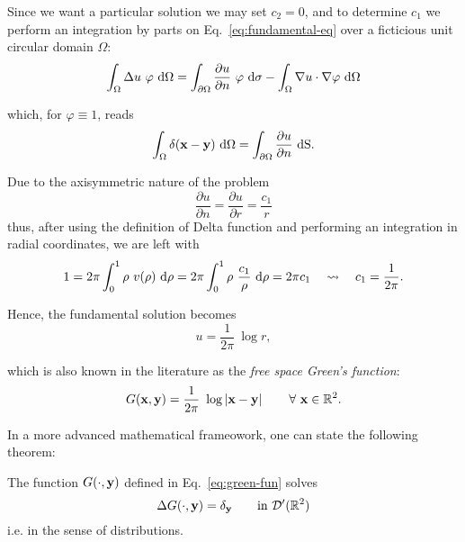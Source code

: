 Since we want a particular solution we may set $c_2=0$, and to determine $c_1$ we perform an integration by parts on Eq.~\eqref{eq:fundamental-eq} over a ficticious unit circular domain $\Omega$:
\begin{equation*}
\int_\Omega \Delta u\ \varphi \  \mathrm{d} \Omega = \int_{\partial\Omega}\frac{\partial u}{\partial n}\ \varphi \  \mathrm{d} \sigma-\int_\Omega \nabla u \cdot \nabla \varphi \  \mathrm{d} \Omega 
\end{equation*}

which, for $\varphi\equiv 1$, reads
\begin{equation*}
\int_\Omega \delta(\mathbf{x}-\mathbf{y})\  \mathrm{d} \Omega = \int_{\partial\Omega}\frac{\partial u}{\partial n} \  \mathrm{d} \mathrm{S}.
\end{equation*}

Due to the axisymmetric nature of the problem
\begin{equation*}
\frac{\partial u}{\partial n}=\frac{\partial u}{\partial r} = \frac{c_1}{r}
\end{equation*}
thus, after using the definition of Delta function and performing an integration in radial coordinates, we are left with
\begin{equation*}
1=2\pi \int_0^1 \rho\ v(\rho) \  \mathrm{d} \rho = 2\pi \int_0^1 \rho\ \frac{c_1}{\rho}\  \mathrm{d} \rho =2\pi c_1\quad\leadsto \quad c_1=\frac{1}{2\pi}.
\end{equation*}

Hence, the fundamental solution becomes 
\begin{equation*}
u=\frac{1}{2\pi}\ \log r,
\end{equation*}

which is also known in the literature as the \emph{free space Green's function}:
\begin{equation}
\label{eq:green-fun}
G(\xv,\yv)=\frac{1}{2\pi}\ \log \left| \xv-\yv \right|\qquad\forall \xv\in\RR^2 .
\end{equation}

In a more advanced mathematical frameowork, one can state the following theorem:
\begin{theorem}
\label{thm:fund-sol}
The function $G(\cdot,\mathbf{y})$ defined in Eq.~\eqref{eq:green-fun} solves
\begin{equation}
\label{eq:distributional-eq}
\Delta G(\cdot,\mathbf{y})=\delta_{\mathbf{y}} \qquad \text{in }\mathcal{D}'(\mathbb{R}^2)
\end{equation}
i.e. in the sense of distributions.
\end{theorem}


